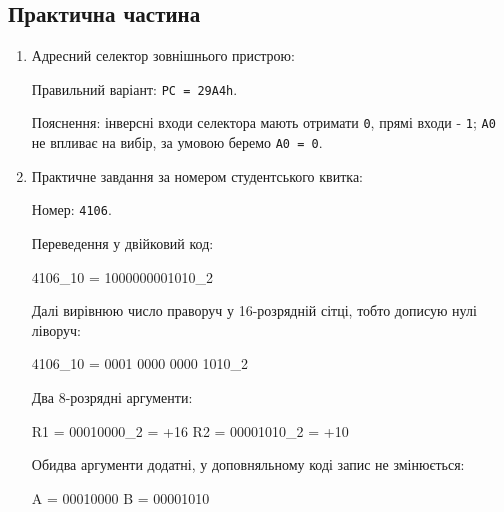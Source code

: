 \documentclass[
  11pt,
]{article}
\newenvironment{Shaded}{}{}
\newcommand{\NormalTok}[1]{#1}
\begin{document}
\subsection{Практична частина}\label{ux43fux440ux430ux43aux442ux438ux447ux43dux430-ux447ux430ux441ux442ux438ux43dux430}

\begin{enumerate}
\def\labelenumi{\arabic{enumi}.}
\setcounter{enumi}{20}
\item
  Адресний селектор зовнішнього пристрою:

  Правильний варіант: \texttt{PC\ =\ 29A4h}.

  Пояснення: інверсні входи селектора мають отримати \texttt{0}, прямі входи - \texttt{1}; \texttt{A0} не впливає на вибір, за умовою беремо \texttt{A0\ =\ 0}.
\item
  Практичне завдання за номером студентського квитка:

  Номер: \texttt{4106}.

  Переведення у двійковий код:

\begin{Shaded}
\begin{Highlighting}[]
\NormalTok{4106\_10 = 1000000001010\_2}
\end{Highlighting}
\end{Shaded}

  Далі вирівнюю число праворуч у 16-розрядній сітці, тобто дописую нулі ліворуч:

\begin{Shaded}
\begin{Highlighting}[]
\NormalTok{4106\_10 = 0001 0000 0000 1010\_2}
\end{Highlighting}
\end{Shaded}

  Два 8-розрядні аргументи:

\begin{Shaded}
\begin{Highlighting}[]
\NormalTok{R1 = 00010000\_2 = +16}
\NormalTok{R2 = 00001010\_2 = +10}
\end{Highlighting}
\end{Shaded}

  Обидва аргументи додатні, у доповняльному коді запис не змінюється:

\begin{Shaded}
\begin{Highlighting}[]
\NormalTok{A = 00010000}
\NormalTok{B = 00001010}
\end{Highlighting}
\end{Shaded}


\end{enumerate}
\end{document}
